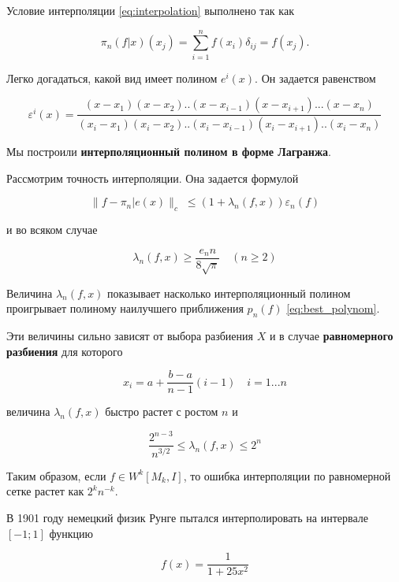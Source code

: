 Условие интерполяции \ref{eq:interpolation} выполнено так как 

\begin{equation}
\pi_n(f|x)(x_j) = \sum_{i = 1}^{n} f(x_i)\delta_{ij} = f(x_j).
\end{equation}

Легко догадаться, какой вид имеет полином $e^i(x)$. Он задается равенством 

\begin{equation}
\varepsilon^i(x) = \frac{(x-x_1)(x-x_2)..(x-x_{i-1})(x-x_{i+1}) ...(x-x_n)}{(x_i-x_1)(x_i-x_2)..(x_i-x_{i-1})(x_i-x_{i+1})..(x_i - x_n )}
\end{equation}

Мы построили \textbf{интерполяционный полином в форме Лагранжа}. 

Рассмотрим точность интерполяции. Она задается формулой 

\begin{equation}
\parallel f - \pi_n| e(x) \parallel_c \; \leq (1+ \lambda_n(f, x))\varepsilon_n(f)
\end{equation}

и во всяком случае 

\begin{equation}
\lambda_n(f, x) \geq \frac{e_n n}{8 \sqrt{\pi}} \quad (n \geq 2)
\end{equation}

Величина $\lambda_n(f, x)$ показывает насколько интерполяционный полином проигрывает полиному наилучшего приближения $p_n(f)$ \ref{eq:best_polynom}.


Эти величины сильно зависят от выбора разбиения $X$ и в случае \textbf{равномерного разбиения} для которого

\begin{equation}
x_i = a + \frac{b-a}{n-1}(i-1) \quad i = 1...n
\end{equation}

величина $\lambda_n(f, x)$ быстро растет с ростом $n$ и


\begin{equation}
\frac{2^{n-3}}{n^{3/2}} \leq \lambda_n(f, x) \leq 2^n
\end{equation} 


Таким образом, если  $f \in W^k[M_k, I]$, то ошибка интерполяции по равномерной сетке растет как $2^kn^{-k}$.

В 1901 году немецкий физик Рунге пытался интерполировать на интервале $[-1; 1]$ функцию

\begin{equation}
f(x) = \frac{1}{1+25x^2}
\end{equation}

